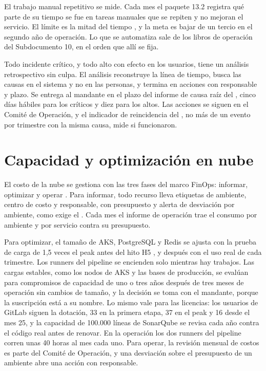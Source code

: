 El trabajo manual repetitivo se mide. Cada mes el paquete 13.2 registra qué parte de su tiempo se fue en
tareas manuales que se repiten y no mejoran el servicio. El límite es la mitad del tiempo
\parencite{beyer2016}, y la meta es bajar de un tercio en el segundo año de operación. Lo que se
automatiza sale de los libros de operación del Subdocumento 10, en el orden que allí se fija.

Todo incidente crítico, y todo alto con efecto en los usuarios, tiene un análisis retrospectivo sin
culpa. El análisis reconstruye la línea de tiempo, busca las causas en el sistema y no en las personas,
y termina en acciones con responsable y plazo. Se entrega al mandante en el plazo del informe de causa
raíz del , cinco días hábiles para los críticos y diez para los altos. Las acciones se
siguen en el Comité de Operación, y el indicador de reincidencia del , no más de un evento
por trimestre con la misma causa, mide si funcionaron.

\section{Capacidad y optimización en nube}\label{sec:11-capacidad-y-optimizacion-en-nube}

El costo de la nube se gestiona con las tres fases del marco FinOps: informar, optimizar y operar
\parencite{finops_framework}. Para informar, todo recurso lleva etiquetas de ambiente, centro de costo y
responsable, con presupuesto y alerta de desviación por ambiente, como exige el . Cada mes
el informe de operación trae el consumo por ambiente y por servicio contra su presupuesto.

Para optimizar, el tamaño de AKS, PostgreSQL y Redis se ajusta con la prueba de carga de 1,5 veces el
peak antes del hito H5 , y después con el uso real de cada trimestre. Los runners
del pipeline se encienden solo mientras hay trabajos. Las cargas estables, como los nodos de AKS y las
bases de producción, se evalúan para compromisos de capacidad de uno o tres años después de tres meses
de operación sin cambios de tamaño, y la decisión se toma con el mandante, porque la suscripción está a
su nombre. Lo mismo vale para las licencias: los usuarios de GitLab siguen la dotación, 33 en la
primera etapa, 37 en el peak y 16 desde el mes 25, y la capacidad de 100.000 líneas de SonarQube se
revisa cada año contra el código real antes de renovar. En la operación los dos runners del pipeline
corren unas 40 horas al mes cada uno. Para operar, la revisión mensual de costos es parte del Comité de
Operación, y una desviación sobre el presupuesto de un ambiente abre una acción con responsable.

